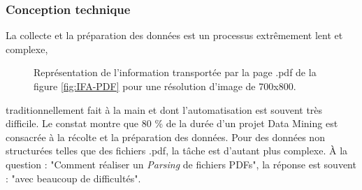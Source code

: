 	\subsubsection{Conception technique}\label{parser}
	\par
	La collecte et la préparation des données est un processus extrêmement lent et complexe,			\begin{figure}
						    		
						    		\caption{Représentation de l'information transportée par la page .pdf de la figure \ref{fig:IFA-PDF} pour une résolution d'image de 700x800.}
						    		\label{fig:charplot}
				\end{figure}  traditionnellement fait à la main et dont l'automatisation est souvent très difficile.
Le constat montre que 80 \% de la durée d'un projet Data Mining est consacrée à la récolte et la préparation des données\cite{DP}. Pour des données non structurées telles que des fichiers .pdf, la tâche est d'autant plus complexe. À la question : "Comment réaliser un \textit{Parsing} de fichiers PDFs", la réponse est souvent : "avec beaucoup de difficultés".

